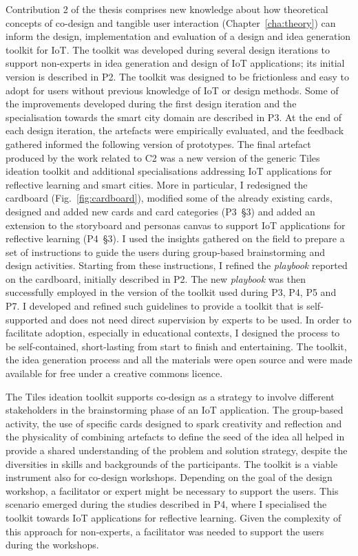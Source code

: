 Contribution 2 of the thesis comprises new knowledge about how theoretical concepts of co-design and tangible user interaction (Chapter~\ref{cha:theory}) can inform the design, implementation and evaluation of a design and idea generation toolkit for IoT. The toolkit was developed during several design iterations to support non-experts in idea generation and design of IoT applications; its initial version is described in P2. The toolkit was designed to be frictionless and easy to adopt for users without previous knowledge of IoT or design methods. Some of the improvements developed during the first design iteration and the specialisation towards the smart city domain are described in P3. At the end of each design iteration, the artefacts were empirically evaluated, and the feedback gathered informed the following version of prototypes. The final artefact produced by the work related to C2 was a new version of the generic Tiles ideation toolkit and additional specialisations addressing IoT applications for reflective learning and smart cities. More in particular, I redesigned the cardboard (Fig.~\ref{fig:cardboard}), modified some of the already existing cards, designed and added new cards and card categories (P3~\S3) and added an extension to the storyboard and personas canvas to support IoT applications for reflective learning (P4~\S3). I used the insights gathered on the field to prepare a set of instructions to guide the users during group-based brainstorming and design activities. Starting from these instructions, I refined the \textit{playbook} reported on the cardboard, initially described in P2. The new \textit{playbook} was then successfully employed in the version of the toolkit used during P3, P4, P5 and P7. I developed and refined such guidelines to provide a toolkit that is self-supported and does not need direct supervision by experts to be used. In order to facilitate adoption, especially in educational contexts, I designed the process to be self-contained, short-lasting from start to finish and entertaining. The toolkit, the idea generation process and all the materials were open source and were made available for free under a creative commons licence.

The Tiles ideation toolkit supports co-design as a strategy to involve different stakeholders in the brainstorming phase of an IoT application. The group-based activity, the use of specific cards designed to spark creativity and reflection and the physicality of combining artefacts to define the seed of the idea all helped in provide a shared understanding of the problem and solution strategy, despite the diversities in skills and backgrounds of the participants. The toolkit is a viable instrument also for co-design workshops. Depending on the goal of the design workshop, a facilitator or expert might be necessary to support the users. This scenario emerged during the studies described in P4, where I specialised the toolkit towards IoT applications for reflective learning. Given the complexity of this approach for non-experts, a facilitator was needed to support the users during the workshops.

